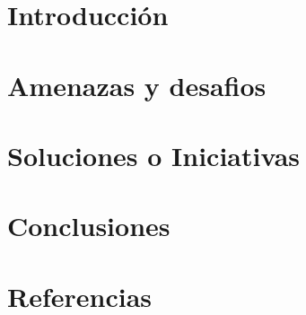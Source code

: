 \section{Introducción}
\section{Amenazas y desafios}
\section{Soluciones o Iniciativas}
\section{Conclusiones}
\section{Referencias}
